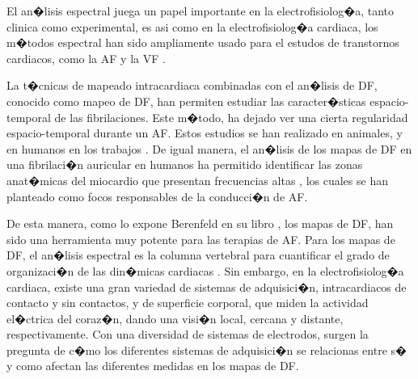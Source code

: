 El an�lisis espectral juega un papel importante en la electrofisiolog�a, tanto
clinica como experimental, es asi como en la electrofisiolog�a cardiaca, los
m�todos espectral han sido ampliamente usado para el estudos de  transtornos
cardiacos, como la \ac{AF}  \cite{Everett01, Lazar04, Sanders05, Atienza06,
Atienza09, Uldry12, Guillem13, Kumagai13, Salinet14} y la  \ac{VF}
\cite{Strohmenger97, Eftestol00, Jekova04, Panfilov09, Mollerus11, Requena13}.



La t�cnicas de mapeado intracardiaca combinadas con  el an�lisis de \ac{DF},
conocido como mapeo de \ac{DF}, han permiten estudiar las
caracter�sticas espacio-temporal de las fibrilaciones. Este m�todo, ha
dejado ver una cierta regularidad espacio-temporal durante un \ac{AF}.
Estos estudios se han realizado en animales, 
\cite{Skanes98,Mandapati00,Mansour01} y en humanos  en los trabajos
\cite{Sanders05,Atienza06}. De igual manera, el an�lisis de los mapas de \ac{DF}
en una fibrilaci�n auricular en humanos ha permitido identificar las zonas
anat�micas del miocardio que presentan frecuencias altas 
\cite{ Sanders05, Atienza09, Kumagai13}, los cuales se han planteado como focos 
responsables de la conducci�n de \ac{AF}. 


De esta manera, como lo expone Berenfeld en su libro \cite{Berenfeld11Book},
los mapas de \ac{DF}, han sido una herramienta muy potente para las terapias de
\ac{AF}. Para los mapas de \ac{DF}, el an�lisis espectral es la columna
vertebral para cuantificar el grado de organizaci�n de las din�micas cardiacas 
\cite{Zipes09}. Sin embargo, en la electrofisiolog�a cardiaca, existe una gran
variedad de sistemas de adquisici�n, intracardiacos de contacto y sin contactos,
y de superficie corporal, que miden la actividad el�ctrica del coraz�n, dando
una visi�n local, cercana  y distante, respectivamente.
Con una  diversidad de sistemas de electrodos, surgen la pregunta de c�mo los
diferentes sistemas de adquisici�n se relacionas entre s� y como afectan las
diferentes medidas en los mapas de \ac{DF}.

